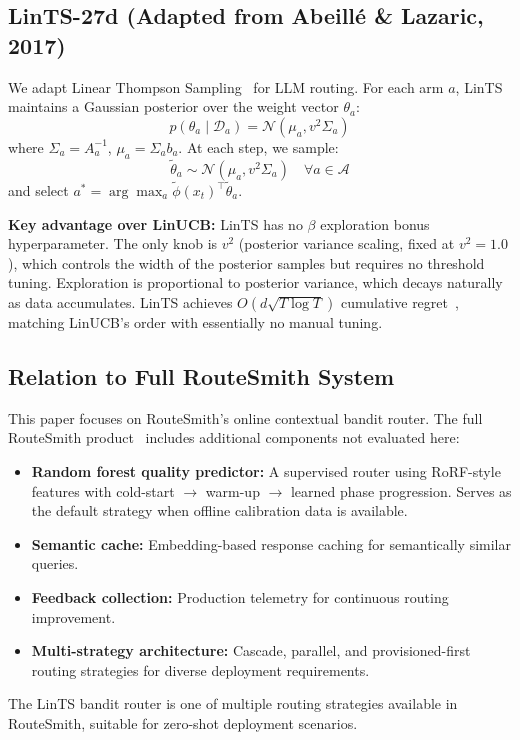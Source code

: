 \documentclass[11pt]{article}
\begin{document}

\subsection{LinTS-27d (Adapted from Abeill\'e \& Lazaric, 2017)}
\label{sec:lints}

We adapt Linear Thompson Sampling~\cite{abeille2017linear} for LLM routing. For each arm $a$, LinTS maintains a Gaussian posterior over the weight vector $\theta_a$:
\begin{equation}
p(\theta_a \mid \mathcal{D}_a) = \mathcal{N}(\mu_a, v^2 \Sigma_a)
\end{equation}
where $\Sigma_a = A_a^{-1}$, $\mu_a = \Sigma_a b_a$. At each step, we sample:
\begin{equation}
\tilde{\theta}_a \sim \mathcal{N}(\mu_a, v^2 \Sigma_a) \quad \forall a \in \mathcal{A}
\end{equation}
and select $a^* = \arg\max_{a} \tilde{\phi}(x_t)^\top \tilde{\theta}_a$.

\textbf{Key advantage over LinUCB:} LinTS has no $\beta$ exploration bonus hyperparameter. The only knob is $v^2$ (posterior variance scaling, fixed at $v^2=1.0$), which controls the width of the posterior samples but requires no threshold tuning. Exploration is proportional to posterior variance, which decays naturally as data accumulates. LinTS achieves $O(d\sqrt{T \log T})$ cumulative regret~\cite{abeille2017linear}, matching LinUCB's order with essentially no manual tuning.

\subsection{Relation to Full RouteSmith System}
\label{sec:product}

This paper focuses on RouteSmith's online contextual bandit router. The full RouteSmith product~\cite{routesmith2025system} includes additional components not evaluated here:
\begin{itemize}
    \item \textbf{Random forest quality predictor:} A supervised router using RoRF-style features with cold-start $\rightarrow$ warm-up $\rightarrow$ learned phase progression. Serves as the default strategy when offline calibration data is available.
    \item \textbf{Semantic cache:} Embedding-based response caching for semantically similar queries.
    \item \textbf{Feedback collection:} Production telemetry for continuous routing improvement.
    \item \textbf{Multi-strategy architecture:} Cascade, parallel, and provisioned-first routing strategies for diverse deployment requirements.
\end{itemize}
The LinTS bandit router is one of multiple routing strategies available in RouteSmith, suitable for zero-shot deployment scenarios.
\end{document}
